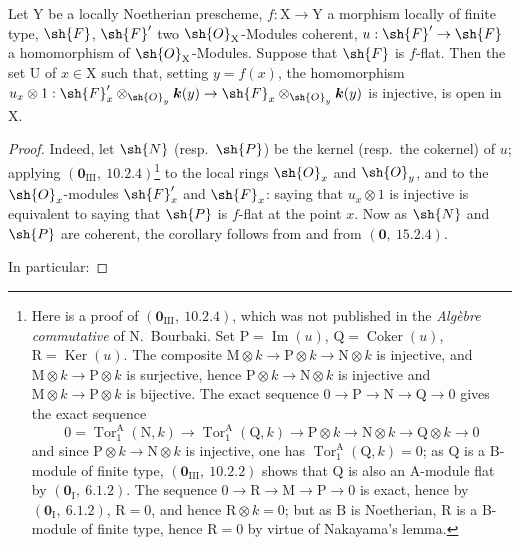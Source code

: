 \begin{corollary}[11.1.2]
\label{IV.11.1.2}
Let $\mathrm{Y}$ be a locally Noetherian prescheme, $f:\mathrm{X}\to\mathrm{Y}$ a morphism locally of finite type, $\sh{F}$, $\sh{F}'$ two $\sh{O}_\mathrm{X}$-Modules coherent, $u:\sh{F}'\to\sh{F}$ a homomorphism of $\sh{O}_\mathrm{X}$-Modules. Suppose that $\sh{F}$ is $f$-flat. Then the set $\mathrm{U}$ of $x\in\mathrm{X}$ such that, setting $y=f(x)$, the homomorphism $u_x\otimes 1:\sh{F}'_x\otimes_{\sh{O}_y}\boldsymbol{k}(y)\to\sh{F}_x\otimes_{\sh{O}_y}\boldsymbol{k}(y)$ is injective, is open in $\mathrm{X}$.
\end{corollary}

\begin{proof}
Indeed, let $\sh{N}$ (resp.\ $\sh{P}$) be the kernel (resp.\ the cokernel) of $u$; applying $(\mathbf{0}_{\mathrm{III}},~10.2.4)$\footnote{Here is a proof of $(\mathbf{0}_{\mathrm{III}},~10.2.4)$, which was not published in the \emph{Alg\`ebre commutative} of N.~Bourbaki. Set $\mathrm{P}=\operatorname{Im}(u)$, $\mathrm{Q}=\operatorname{Coker}(u)$, $\mathrm{R}=\operatorname{Ker}(u)$. The composite $\mathrm{M}\otimes k\to\mathrm{P}\otimes k\to\mathrm{N}\otimes k$ is injective, and $\mathrm{M}\otimes k\to\mathrm{P}\otimes k$ is surjective, hence $\mathrm{P}\otimes k\to\mathrm{N}\otimes k$ is injective and $\mathrm{M}\otimes k\to\mathrm{P}\otimes k$ is bijective. The exact sequence $0\to\mathrm{P}\to\mathrm{N}\to\mathrm{Q}\to 0$ gives the exact sequence
\[
0=\operatorname{Tor}_1^\mathrm{A}(\mathrm{N},k)\to\operatorname{Tor}_1^\mathrm{A}(\mathrm{Q},k)\to\mathrm{P}\otimes k\to\mathrm{N}\otimes k\to\mathrm{Q}\otimes k\to 0
\]
and since $\mathrm{P}\otimes k\to\mathrm{N}\otimes k$ is injective, one has $\operatorname{Tor}_1^\mathrm{A}(\mathrm{Q},k)=0$; as $\mathrm{Q}$ is a B-module of finite type, $(\mathbf{0}_{\mathrm{III}},~10.2.2)$ shows that $\mathrm{Q}$ is also an A-module flat by $(\mathbf{0}_\mathrm{I},~6.1.2)$. The sequence $0\to\mathrm{R}\to\mathrm{M}\to\mathrm{P}\to 0$ is exact, hence by $(\mathbf{0}_\mathrm{I},~6.1.2)$, $\mathrm{R}=0$, and hence $\mathrm{R}\otimes k=0$; but as $\mathrm{B}$ is Noetherian, $\mathrm{R}$ is a B-module of finite type, hence $\mathrm{R}=0$ by virtue of Nakayama's lemma.}
to the local rings $\sh{O}_x$ and $\sh{O}_y$, and to the $\sh{O}_x$-modules $\sh{F}'_x$ and $\sh{F}_x$: saying that $u_x\otimes 1$ is injective is equivalent to saying that $\sh{P}$ is $f$-flat at the point $x$. Now as $\sh{N}$ and $\sh{P}$ are coherent, the corollary follows from  and from $(\mathbf{0},~15.2.4)$.

In particular:
\end{proof}

